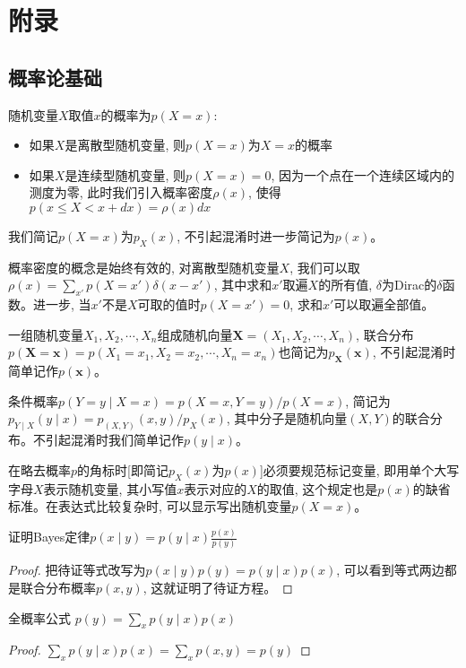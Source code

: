 \chapter*{附录}
\section{概率论基础}
\par 随机变量$X$取值$x$的概率为$p(X=x)$:
\begin{itemize}
    \item 如果$X$是离散型随机变量, 则$p(X=x)$为$X=x$的概率
    \item 如果$X$是连续型随机变量, 则$p(X=x)=0$, 因为一个点在一个连续区域内的测度为零, 此时我们引入概率密度$\rho(x)$, 使得$p(x\leq X<x+dx)=\rho(x)dx$
\end{itemize}
我们简记$p(X=x)$为$p_X(x)$, 不引起混淆时进一步简记为$p(x)$。
\par 概率密度的概念是始终有效的, 对离散型随机变量$X$, 我们可以取$\rho(x)=\sum_{x'}p(X=x')\delta(x-x')$, 其中求和$x'$取遍$X$的所有值, $\delta$为Dirac的$\delta$函数。进一步, 当$x'$不是$X$可取的值时$p(X=x')=0$, 求和$x'$可以取遍全部值。
\par 一组随机变量$X_1,X_2,\cdots,X_n$组成随机向量$\bm X=(X_1,X_2,\cdots,X_n)$, 联合分布$p(\bm X=\bm x)=p(X_1=x_1,X_2=x_2,\cdots,X_n=x_n)$也简记为$p_{\bm X}(\bm x)$, 不引起混淆时简单记作$p(\bm x)$。
\par 条件概率$p(Y=y\mid X=x)=p(X=x,Y=y)/p(X=x)$, 简记为$p_{Y\mid X}(y\mid x)=p_{(X,Y)}(x,y)/p_X(x)$, 其中分子是随机向量$(X,Y)$的联合分布。不引起混淆时我们简单记作$p(y\mid x)$。
\par{}\quad 在略去概率$p$的角标时[即简记$p_X(x)$为$p(x)$]必须要规范标记变量, 即用单个大写字母$X$表示随机变量, 其小写值$x$表示对应的$X$的取值, 这个规定也是$p(x)$的缺省标准。在表达式比较复杂时, 可以显示写出随机变量$p(X=x)$。
\begin{exercise}[A.1] 证明Bayes定律$p(x\mid y)=p(y\mid x)\frac{p(x)}{p(y)}$
\end{exercise}
\begin{proof}
    把待证等式改写为$p(x\mid y)p(y)=p(y\mid x)p(x)$, 可以看到等式两边都是联合分布概率$p(x,y)$, 这就证明了待证方程。
\end{proof}
\begin{exercise}[A.2]
    全概率公式 $p(y)=\sum_x p(y\mid x)p(x)$
\end{exercise}
\begin{proof}
    $\sum_x p(y\mid x)p(x)=\sum_x p(x,y)=p(y)$
\end{proof}
